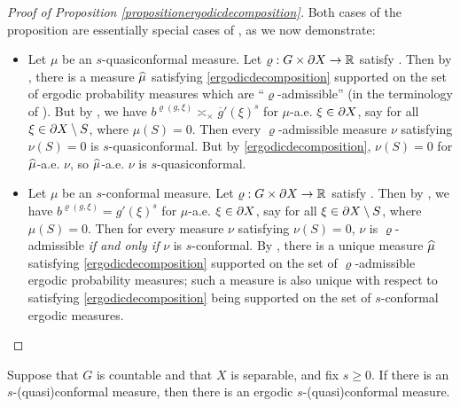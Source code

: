 \begin{proof}[Proof of Proposition \ref{propositionergodicdecomposition}]
Both cases of the proposition are essentially special cases of \cite[Theorem 1.4]{GreschonigSchmidt}, as we now demonstrate:
\begin{itemize}
\item[(i)]
Let $\mu$ be an $s$-quasiconformal measure. Let $\varrho:G\times\del X\to\R$ satisfy \cite[(1.1)-(1.3)]{GreschonigSchmidt}. Then by \cite[Theorem 1.4]{GreschonigSchmidt}, there is a measure $\widehat\mu$ satisfying \eqref{ergodicdecomposition} supported on the set of ergodic probability measures which are ``$\varrho$-admissible'' (in the terminology of \cite{GreschonigSchmidt}). But by \cite[(1.1)]{GreschonigSchmidt}, we have $b^{\varrho(g,\xi)}\asymp_\times \overline g'(\xi)^s$ for $\mu$-a.e. $\xi\in\partial X$, say for all $\xi\in\partial X\setminus S$, where $\mu(S) = 0$. Then every $\varrho$-admissible measure $\nu$ satisfying $\nu(S) = 0$ is $s$-quasiconformal. But by \eqref{ergodicdecomposition}, $\nu(S) = 0$ for $\widehat\mu$-a.e. $\nu$, so $\widehat\mu$-a.e. $\nu$ is $s$-quasiconformal.
\item[(ii)] Let $\mu$ be an $s$-conformal measure. Let $\varrho:G\times\del X\to\R$ satisfy \cite[(1.1)-(1.3)]{GreschonigSchmidt}. Then by \cite[(1.1)]{GreschonigSchmidt}, we have $b^{\varrho(g,\xi)} = g'(\xi)^s$ for $\mu$-a.e. $\xi\in\partial X$, say for all $\xi\in\partial X\setminus S$, where $\mu(S) = 0$. Then for every measure $\nu$ satisfying $\nu(S) = 0$, $\nu$ is $\varrho$-admissible \emph{if and only if} $\nu$ is $s$-conformal. By \cite[Theorem 1.4]{GreschonigSchmidt}, there is a unique measure $\widehat\mu$ satisfying \eqref{ergodicdecomposition} supported on the set of $\varrho$-admissible ergodic probability measures; such a measure is also unique with respect to satisfying \eqref{ergodicdecomposition} being supported on the set of $s$-conformal ergodic measures.
\end{itemize}
\end{proof}

\begin{corollary}
Suppose that $G$ is countable and that $X$ is separable, and fix $s\geq 0$. If there is an $s$-(quasi)conformal measure, then there is an ergodic $s$-(quasi)conformal measure.
\end{corollary}

